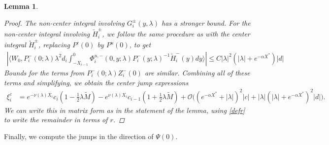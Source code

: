 \documentclass[10pt,reqno]{amsart}
\theoremstyle{plain}
\newtheorem{lemma}[theorem]{Lemma}
\theoremstyle{definition}
\theoremstyle{remark}
\numberwithin{theorem}{section}
\numberwithin{equation}{section}
\begin{document}
\begin{lemma}
\begin{proof}
The non-center integral involving $G_i^\pm(y, \lambda)$ has a stronger bound. For the non-center integral involving $\tilde{H}_i^\pm$, we follow the same procedure as with the center integral $\tilde{H}_i^\pm$, replacing $P^c(0)$ by $P^u(0)$, to get
\begin{align*}
\left|  \langle W_0, P_i^-(0; \lambda) \lambda^2 d_i \int_{-X_{i-1}}^0 \Phi_i^{u,-}(0, y; \lambda) P_i^-(y; \lambda)^{-1} \tilde{H}_i^-(y) dy \rangle \right| \leq C |\lambda|^2 (|\lambda| + e^{- \alpha X^*}) |d|
\end{align*}
Bounds for the terms from $P_i^-(0; \lambda) Z_i^-(0)$ are similar. Combining all of these terms and simplifying, we obtain the center jump expressions
\begin{align*}
\xi^c_i &= e^{-\nu(\lambda)X_i}c_i\left( 1 - \frac{1}{2}\lambda \tilde{M} \right) 
- e^{\nu(\lambda)X_i}c_{i-1}\left( 1 + \frac{1}{2}\lambda \tilde{M} \right) + \mathcal{O}\Big( (e^{-\alpha X^*} + |\lambda|)^2 |c| + |\lambda| (|\lambda| + e^{-\alpha X^*})^2 |d| \Big).
\end{align*}
We can write this in matrix form as in the statement of the lemma, using \cref{defr} to write the remainder in terms of $r$.
\end{proof}
\end{lemma}

Finally, we compute the jumps in the direction of $\Psi(0)$.
\end{document}
